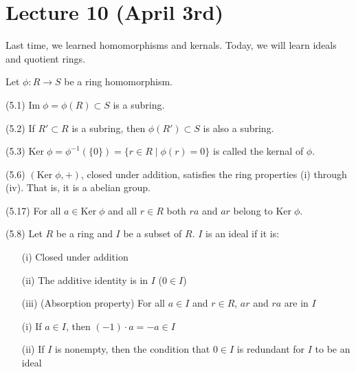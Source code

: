 \section{Lecture 10 (April 3rd)}
Last time, we learned homomorphisms and kernals. Today, we will learn ideals and quotient rings.
\\
\begin{recall}
Let $\phi :R\rightarrow S$ be a ring homomorphism. 
\end{recall}
\vspace{2ex}
\begin{prop}
(5.1) $\mathrm{Im}\;\phi =\phi (R)\subset S$ is a subring.
\end{prop}
\vspace{2ex}
\begin{rmk}
(5.2) If $R'\subset R$ is a subring, then $\phi (R')\subset S$ is also a subring.
\end{rmk}
\vspace{2ex}
\begin{defi}
(5.3) $\mathrm{Ker}\;\phi =\phi ^{-1}(\{0\})=\{r\in R \;|\; \phi (r)=0\}$ is called the kernal of $\phi $. 
\end{defi}
\vspace{2ex}
\begin{prop}
(5.6) $(\mathrm{Ker}\;\phi ,+)$, closed under addition, satisfies the ring properties (i) through (iv). That is, it is a abelian group. 
\end{prop}
\vspace{2ex}
\begin{prop}
(5.17) For all $a\in \mathrm{Ker}\;\phi $ and all $r\in R$ both $ra$ and $ar$ belong to $\mathrm{Ker}\;\phi $. 
\end{prop}
\vspace{2ex}
\begin{defi}
(5.8) Let $R$ be a ring and $I$ be a subset of $R$. $I$ is an ideal if it is:
\begin{itemize}
\item[(i)] Closed under addition
\item[(ii)] The additive identity is in $I$ ($0\in I$)
\item[(iii)] (Absorption property) For all $a\in I$ and $r\in R$, $ar$ and $ra$ are in $I$
\end{itemize}
\end{defi}
\vspace{2ex}
\begin{rmk}
\begin{itemize}
\item[(i)] If $a\in I$, then $(-1)\cdot a=-a\in I$
\item[(ii)] If $I$ is nonempty, then the condition that $0\in I$ is redundant for $I$ to be an ideal
\end{itemize}
\end{rmk}
